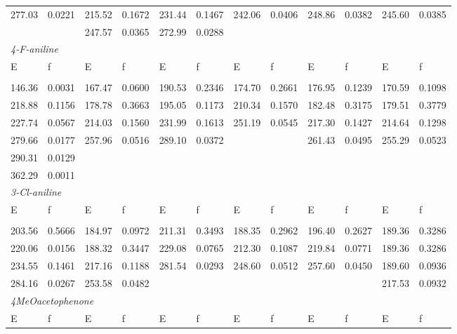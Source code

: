 \documentclass[
journal=jpcbfk, %
manuscript=article]{achemso}
\begin{document}
\begin{table}[ht]
\begin{tabular}[l]{llllllllllll}
							277.03 &  0.0221 &  215.52 &  0.1672 &  231.44 &  0.1467 &  242.06 &  0.0406 &  248.86 &  0.0382 &  245.60 &  0.0385 \\
							~ & ~  & 247.57 &  0.0365 &  272.99 &  0.0288 & ~  & ~  & ~  & ~  & ~  & ~  \\ [1ex]
							\multicolumn{10}{l}{\textit{4-F-aniline}} \\ [1ex]
							E    & f    & E    & f    & E    & f    & E    & f    & E    & f    & E    & f \\ [0.5ex]
							\hline\hline
							\\[-0.5ex]
							146.36 &  0.0031 &  167.47 &  0.0600 &  190.53 &  0.2346 &  174.70 &  0.2661 &  176.95 &  0.1239 &  170.59 &  0.1098 \\
							218.88 &  0.1156 &  178.78 &  0.3663 &  195.05 &  0.1173 &  210.34 &  0.1570 &  182.48 &  0.3175 &  179.51 &  0.3779 \\
							227.74 &  0.0567 &  214.03 &  0.1560 &  231.99 &  0.1613 &  251.19 &  0.0545 &  217.30 &  0.1427 &  214.64 &  0.1298 \\
							279.66 &  0.0177 &  257.96 &  0.0516 &  289.10 &  0.0372 & ~  & ~  &  261.43 &  0.0495 &  255.29 &  0.0523 \\
							290.31 &  0.0129 & ~  & ~  & ~  & ~  & ~  & ~  & ~  &   & ~  & ~  \\
							362.29 &  0.0011 & ~  & ~  & ~  & ~  & ~  & ~  & ~  & ~  & ~  & ~  \\ [1ex]
							\multicolumn{10}{l}{\textit{3-Cl-aniline}} \\ [1ex]
							E    & f    & E    & f    & E    & f    & E    & f    & E    & f    & E    & f \\ [0.5ex]
							\hline\hline
							\\[-0.5ex]
							203.56 &  0.5666 &  184.97 &  0.0972 &  211.31 &  0.3493 &  188.35 &  0.2962 &  196.40 &  0.2627 &  189.36 &  0.3286 \\
							220.06 &  0.0156 &  188.32 &  0.3447 &  229.08 &  0.0765 &  212.30 &  0.1087 &  219.84 &  0.0771 &  189.36 &  0.3286 \\
							234.55 &  0.1461 &  217.16 &  0.1188 &  281.54 &  0.0293 &  248.60 &  0.0512 &  257.60 &  0.0450 &  189.60 &  0.0936 \\
							284.16 &  0.0267 &  253.58 &  0.0482 & ~  & ~  & ~  & ~  & ~  & ~  &  217.53 &  0.0932 \\ [1ex]
							\multicolumn{10}{l}{\textit{4MeOacetophenone}} \\ [1ex]
							E    & f    & E    & f    & E    & f    & E    & f    & E    & f    & E    & f \\ [0.5ex]

\end{tabular}
\end{table}
\end{document}
